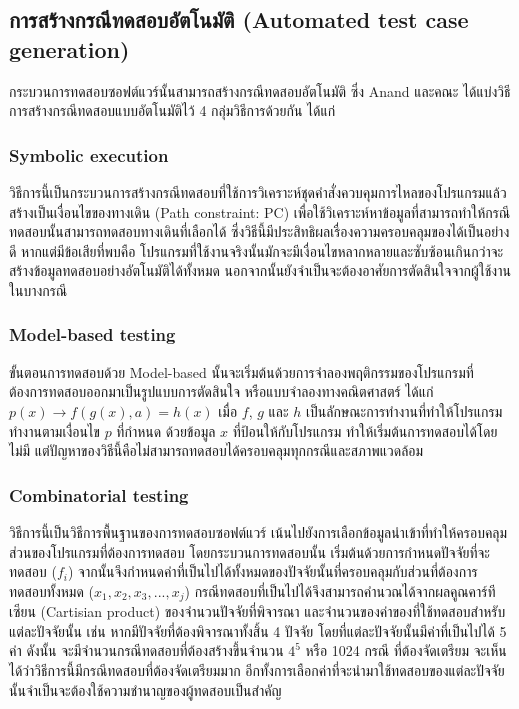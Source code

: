 \subsection{การสร้างกรณีทดสอบอัตโนมัติ (Automated test case generation)}

กระบวนการทดสอบซอฟต์แวร์นั้นสามารถสร้างกรณีทดสอบอัตโนมัติ ซึ่ง Anand และคณะ \cite{Anand2013} ได้แบ่งวิธีการสร้างกรณีทดสอบแบบอัตโนมัติไว้
4 กลุ่มวิธีการด้วยกัน ได้แก่ 

\subsubsection{Symbolic execution}

วิธีการนี้เป็นกระบวนการสร้างกรณีทดสอบที่ใช้การวิเคราะห์ชุดคำสั่งควบคุมการไหลของโปรแกรมแล้วสร้างเป็นเงื่อนไขของทางเดิน (Path constraint: PC) 
เพื่อใช้วิเคราะห์หาข้อมูลที่สามารถทำให้กรณีทดสอบนั้นสามารถทดสอบทางเดินที่เลือกได้ ซึ่งวิธีนี้มีประสิทธิผลเรื่องความครอบคลุมของ{\sourcecode}ได้เป็นอย่างดี
หากแต่มีข้อเสียที่พบคือ โปรแกรมที่ใช้งานจริงนั้นมักจะมีเงื่อนไขหลากหลายและซับซ้อนเกินกว่าจะสร้างข้อมูลทดสอบอย่างอัตโนมัติได้ทั้งหมด 
นอกจากนั้นยังจำเป็นจะต้องอาศัยการตัดสินใจจากผู้ใช้งานในบางกรณี


\subsubsection{Model-based testing}

ขั้นตอนการทดสอบด้วย Model-based นั้นจะเริ่มต้นด้วยการจำลองพฤติกรรมของโปรแกรมที่ต้องการทดสอบออกมาเป็นรูปแบบการตัดสินใจ หรือแบบจำลองทางคณิตศาสตร์
ได้แก่ $p(x) \rightarrow f(g(x), a) = h(x)$ เมื่อ $f$, $g$ และ $h$ เป็นลักษณะการทำงานที่ทำให้โปรแกรมทำงานตามเงื่อนไข $p$ ที่กำหนด 
ด้วยข้อมูล $x$ ที่ป้อนให้กับโปรแกรม ทำให้เริ่มต้นการทดสอบได้โดยไม่มี{\sourcecode} แต่ปัญหาของวิธีนี้คือไม่สามารถทดสอบได้ครอบคลุมทุกกรณีและสภาพแวดล้อม

\subsubsection{Combinatorial testing}

วิธีการนี้เป็นวิธีการพื้นฐานของการทดสอบซอฟต์แวร์ เน้นไปยังการเลือกข้อมูลนำเข้าที่ทำให้ครอบคลุมส่วนของโปรแกรมที่ต้องการทดสอบ โดยกระบวนการทดสอบนั้น
เริ่มต้นด้วยการกำหนดปัจจัยที่จะทดสอบ ($f_i$) จากนั้นจึงกำหนดค่าที่เป็นไปได้ทั้งหมดของปัจจัยนั้นที่ครอบคลุมกับส่วนที่ต้องการทดสอบทั้งหมด 
(${x_1, x_2, x_3, ..., x_j}$) กรณีทดสอบที่เป็นไปได้จึงสามารถคำนวณได้จากผลคูณคาร์ทีเซียน (Cartisian product) ของจำนวนปัจจัยที่พิจารณา 
และจำนวนของค่าของที่ใช้ทดสอบสำหรับแต่ละปัจจัยนั้น เช่น หากมีปัจจัยที่ต้องพิจารณาทั้งสิ้น 4 ปัจจัย โดยที่แต่ละปัจจัยนั้นมีค่าที่เป็นไปได้ 5 ค่า ดังนั้น 
จะมีจำนวนกรณีทดสอบที่ต้องสร้างขึ้นจำนวน $4^5$ หรือ 1024 กรณี ที่ต้องจัดเตรียม จะเห็นได้ว่าวิธีการนี้มีกรณีทดสอบที่ต้องจัดเตรียมมาก 
อีกทั้งการเลือกค่าที่จะนำมาใช้ทดสอบของแต่ละปัจจัยนั้นจำเป็นจะต้องใช้ความชำนาญของผู้ทดสอบเป็นสำคัญ

